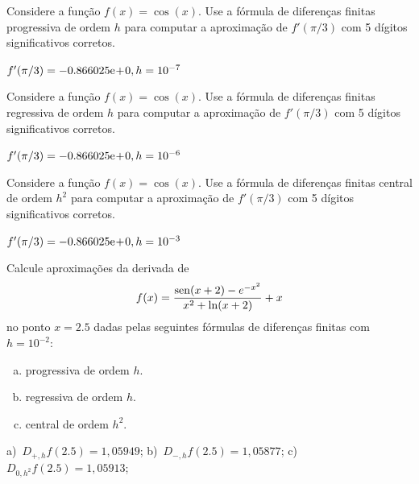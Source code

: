 \begin{exer}
  Considere a função $f(x) = \cos(x)$. Use a fórmula de diferenças finitas progressiva de ordem $h$ para computar a aproximação de $f'(\pi/3)$ com 5 dígitos significativos corretos.
\end{exer}
\begin{resp}
  $f'(\pi/3) = -0.866025\mathrm{e}\!+\!0, h=10^{-7}$
\end{resp}

\begin{exer}
  Considere a função $f(x) = \cos(x)$. Use a fórmula de diferenças finitas regressiva de ordem $h$ para computar a aproximação de $f'(\pi/3)$ com 5 dígitos significativos corretos.
\end{exer}
\begin{resp}
  $f'(\pi/3) = -0.866025\mathrm{e}\!+\!0, h=10^{-6}$
\end{resp}

\begin{exer}
  Considere a função $f(x) = \cos(x)$. Use a fórmula de diferenças finitas central de ordem $h^2$ para computar a aproximação de $f'(\pi/3)$ com 5 dígitos significativos corretos.
\end{exer}
\begin{resp}
  $f'(\pi/3) = -0.866025\mathrm{e}\!+\!0, h=10^{-3}$
\end{resp}

\begin{exer}\label{cap_deriv_sec_df:exer:df_fun}
  Calcule aproximações da derivada de
  \begin{equation}
    f(x) = \frac{\operatorname{sen}(x+2) - e^{-x^2}}{x^2 + \ln(x+2)}+x
  \end{equation}
no ponto $x=2.5$ dadas pelas seguintes fórmulas de diferenças finitas com $h=10^{-2}$:
\begin{enumerate}[a)]
\item progressiva de ordem $h$.
\item regressiva de ordem $h$.
\item central de ordem $h^2$.
\end{enumerate}
\end{exer}
\begin{resp}
  a)~$D_{+,h}f(2.5)=1,05949$; b)~$D_{-,h}f(2.5)=1,05877$; c)~$D_{0,h^2}f(2.5)=1,05913$;
\end{resp}

